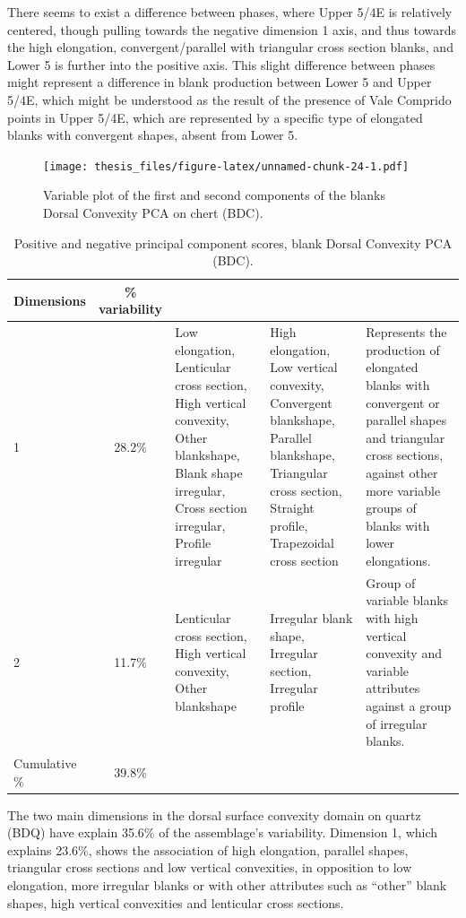 \documentclass[12pt,twoside]{reedthesis}
\begin{document}
There seems to exist a difference between phases, where Upper 5/4E is relatively centered, though pulling towards the negative dimension 1 axis, and thus towards the high elongation, convergent/parallel with triangular cross section blanks, and Lower 5 is further into the positive axis. This slight difference between phases might represent a difference in blank production between Lower 5 and Upper 5/4E, which might be understood as the result of the presence of Vale Comprido points in Upper 5/4E, which are represented by a specific type of elongated blanks with convergent shapes, absent from Lower 5.
\begin{figure}
\centering
\texttt{[image: thesis\_files/figure-latex/unnamed-chunk-24-1.pdf]}
\caption{\label{fig:unnamed-chunk-24}Variable plot of the first and second components of the blanks Dorsal Convexity PCA on chert (BDC).}
\end{figure}
\begin{table}[!h]

\caption{\label{tab:unnamed-chunk-25}Positive and negative principal component scores, blank Dorsal Convexity PCA (BDC).}
\centering
\begin{tabular}[t]{lc>{\raggedright\arraybackslash}p{3cm}>{\raggedright\arraybackslash}p{3cm}>{\raggedright\arraybackslash}p{3cm}}
\toprule
\multicolumn{1}{c}{\textbf{Dimensions}} & \multicolumn{1}{c}{\textbf{\% variability}} & \multicolumn{1}{>{\centering\arraybackslash}p{3cm}}{\textbf{+}} & \multicolumn{1}{>{\centering\arraybackslash}p{3cm}}{\textbf{-}} & \multicolumn{1}{>{\centering\arraybackslash}p{3cm}}{\textbf{Interpretation}}\\
\midrule
1 & 28.2\% & Low elongation, Lenticular cross section, High vertical convexity, Other blankshape,
                              Blank shape irregular, Cross section irregular, Profile irregular & High elongation, Low vertical convexity, Convergent blankshape, Parallel blankshape, Triangular cross section,
                               Straight profile, Trapezoidal cross section & Represents the production of elongated blanks with convergent or parallel shapes and triangular cross sections,
                               against other more variable groups of blanks with lower elongations.\\
2 & 11.7\% & Lenticular cross section, High vertical convexity, Other blankshape & Irregular blank shape, Irregular section, Irregular profile & Group of variable blanks with high vertical convexity and variable attributes against a group of irregular blanks.\\
Cumulative \% & 39.8\% &  &  & \\
\bottomrule
\end{tabular}
\end{table}
The two main dimensions in the dorsal surface convexity domain on quartz (BDQ) have explain 35.6\% of the assemblage's variability.
Dimension 1, which explains 23.6\%, shows the association of high elongation, parallel shapes, triangular cross sections and low vertical convexities, in opposition to low elongation, more irregular blanks or with other attributes such as ``other'' blank shapes, high vertical convexities and lenticular cross sections.
\end{document}
